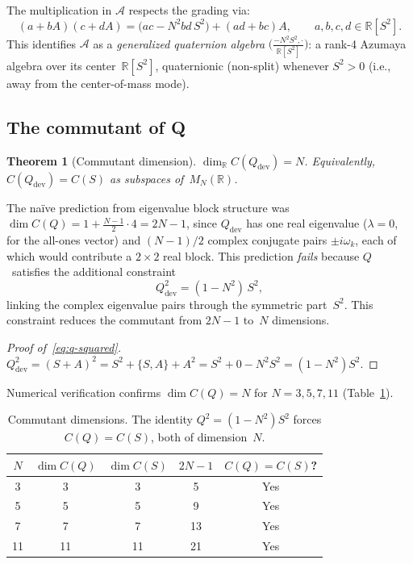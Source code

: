 \documentclass[aps,prd,twocolumn,superscriptaddress,floatfix,nofootinbib]{revtex4-2}
\newtheorem{theorem}{Theorem}
\theoremstyle{definition}
\theoremstyle{remark}
\begin{document}
The multiplication in $\mathcal{A}$ respects the grading via:
\begin{equation}\label{eq:sa-mult}
  (a + bA)(c + dA) = \bigl(ac - N^2 bd\, S^2\bigr) + (ad + bc)A,
  \qquad a,b,c,d \in \mathbb{R}[S^2].
\end{equation}
This identifies $\mathcal{A}$ as a \emph{generalized quaternion algebra}
$\bigl(\frac{-N^2 S^2, \cdot}{\mathbb{R}[S^2]}\bigr)$:
a rank-4 Azumaya algebra over its center~$\mathbb{R}[S^2]$,
quaternionic (non-split) whenever $S^2 > 0$ (i.e., away from
the center-of-mass mode).

\subsection{The commutant of Q}
\label{ssec:q-commutant}

\begin{theorem}[Commutant dimension]\label{thm:cq-dim}
  $\dim_{\mathbb{R}} C(Q_{\mathrm{dev}}) = N$. Equivalently,
  $C(Q_{\mathrm{dev}}) = C(S)$ as subspaces of~$M_N(\mathbb{R})$.
\end{theorem}

The na\"ive prediction from eigenvalue block structure was
$\dim C(Q) = 1 + \frac{N-1}{2}\cdot 4 = 2N-1$, since
$Q_{\mathrm{dev}}$ has one real eigenvalue ($\lambda = 0$,
for the all-ones vector) and $(N-1)/2$ complex conjugate pairs
$\pm i\omega_k$, each of which would contribute a $2\times 2$
real block. This prediction \emph{fails} because $Q$~satisfies
the additional constraint
\begin{equation}\label{eq:q-squared}
  Q_{\mathrm{dev}}^2 = (1 - N^2)\, S^2,
\end{equation}
linking the complex eigenvalue pairs through the symmetric
part~$S^2$. This constraint reduces the commutant from
$2N-1$ to~$N$ dimensions.

\begin{proof}[Proof of~\eqref{eq:q-squared}]
  $Q_{\mathrm{dev}}^2 = (S+A)^2 = S^2 + \{S,A\} + A^2 = S^2 + 0 - N^2 S^2
  = (1-N^2)S^2$.
\end{proof}

Numerical verification confirms $\dim C(Q) = N$ for $N = 3, 5, 7, 11$
(Table~\ref{tab:commutant-dims}).

\begin{table}[h]
  \centering
  \begin{tabular}{c c c c c}
    \toprule
    $N$ & $\dim C(Q)$ & $\dim C(S)$ & $2N-1$ & $C(Q) = C(S)$? \\
    \midrule
    3   & 3   & 3   & 5   & Yes \\
    5   & 5   & 5   & 9   & Yes \\
    7   & 7   & 7   & 13  & Yes \\
    11  & 11  & 11  & 21  & Yes \\
    \bottomrule
  \end{tabular}
  \caption{Commutant dimensions. The identity $Q^2 = (1-N^2)S^2$
    forces $C(Q) = C(S)$, both of dimension~$N$.}
  \label{tab:commutant-dims}
\end{table}
\end{document}
